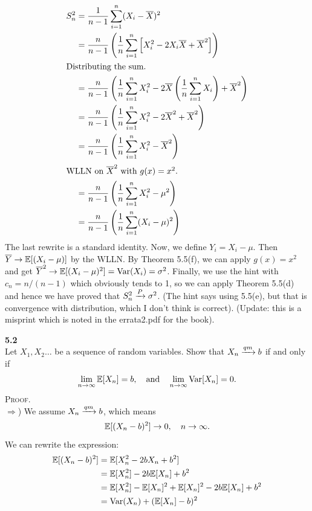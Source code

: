 \newpage\noindent
\begin{align*}
    S_n^2 &= \frac{1}{n-1}\sum_{i=1}^n(X_i - \bar{X})^2 \\
    &= \frac{n}{n-1}\left(\frac{1}{n}\sum_{i=1}^n\Big[X_i^2 - 2X_i\bar{X} + \bar{X}^2\Big]\right) \\
    \shortintertext{Distributing the sum.}
    &= \frac{n}{n-1}\left(\frac{1}{n}\sum_{i=1}^nX_i^2 - 2\bar{X}\left(\frac{1}{n}\sum_{i=1}^n X_i\right) + \bar{X}^2\right) \\
    &= \frac{n}{n-1}\left(\frac{1}{n}\sum_{i=1}^nX_i^2 - 2\bar{X}^2 + \bar{X}^2\right) \\
    &= \frac{n}{n-1}\left(\frac{1}{n}\sum_{i=1}^nX_i^2 - \bar{X}^2\right) \\
    \shortintertext{WLLN on $\bar{X}^2$ with $g(x) = x^2$.}
    &= \frac{n}{n-1}\left(\frac{1}{n}\sum_{i=1}^nX_i^2 - \mu^2\right) \\
    &= \frac{n}{n-1}\left(\frac{1}{n}\sum_{i=1}^n(X_i - \mu)^2\right)
\end{align*}
The last rewrite is a standard identity. Now, we define $Y_i = X_i - \mu$. Then
$\bar{Y} \ra \E[(X_i - \mu)]$ by the WLLN. By Theorem 5.5(f), we can apply $g(x) = x^2$
and get $\bar{Y}^2 \ra \E[(X_i - \mu)^2] = \V(X_i) = \sigma^2$. Finally, we use the hint
with $c_n = n/(n-1)$ which obviously tends to 1, so we can apply
Theorem 5.5(d) and hence we have proved that $S_n^2 \raP \sigma^2$. (The hint says using
5.5(e), but that is convergence with distribution, which I don't think is correct).
(Update: this is a misprint which is noted in the errata2.pdf for the book).

\bigskip\noindent
\textbf{5.2}\\  %
Let $X_1,X_2\ldots$ be a sequence of random variables. Show that $X_n \raQ b$
if and only if
$$
\lim_{n\ra\infty}\E[X_n] = b,
\quad\text{and}\quad
\lim_{n\ra\infty}\V[X_n] = 0.
$$
\textsc{Proof}.\\
$\Rightarrow$) We assume $X_n \raQ b$, which means
$$
\E[(X_n - b)^2]\ra 0,\quad n\ra\infty.
$$
We can rewrite the expression:
\begin{align*}
    \E[(X_n - b)^2] &= \E[X_n^2 - 2bX_n + b^2] \\
    &= \E[X_n^2] - 2b\E[X_n] + b^2 \\
    &= \E[X_n^2] - \E[X_n]^2 + \E[X_n]^2 - 2b\E[X_n] + b^2 \\
    &= \V(X_n) + (\E[X_n] - b)^2
\end{align*}

